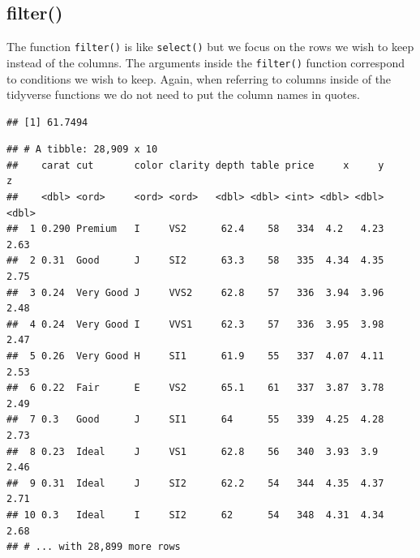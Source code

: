 \documentclass[
]{book}
\newenvironment{Shaded}{\begin{snugshade}}{\end{snugshade}}
\newcommand{\CommentTok}[1]{\textcolor[rgb]{0.56,0.35,0.01}{\textit{#1}}}
\newcommand{\KeywordTok}[1]{\textcolor[rgb]{0.13,0.29,0.53}{\textbf{#1}}}
\newcommand{\NormalTok}[1]{#1}
\newcommand{\OperatorTok}[1]{\textcolor[rgb]{0.81,0.36,0.00}{\textbf{#1}}}
\newcommand{\StringTok}[1]{\textcolor[rgb]{0.31,0.60,0.02}{#1}}
\begin{document}
\hypertarget{filter}{%
\subsection{filter()}\label{filter}}

The function \texttt{filter()} is like \texttt{select()} but we focus on the rows we wish to keep instead of the columns. The arguments inside the \texttt{filter()} function correspond to conditions we wish to keep. Again, when referring to columns inside of the tidyverse functions we do not need to put the column names in quotes.

\begin{Shaded}
\end{Shaded}

\begin{verbatim}
## [1] 61.7494
\end{verbatim}

\begin{Shaded}
\end{Shaded}

\begin{verbatim}
## # A tibble: 28,909 x 10
##    carat cut       color clarity depth table price     x     y     z
##    <dbl> <ord>     <ord> <ord>   <dbl> <dbl> <int> <dbl> <dbl> <dbl>
##  1 0.290 Premium   I     VS2      62.4    58   334  4.2   4.23  2.63
##  2 0.31  Good      J     SI2      63.3    58   335  4.34  4.35  2.75
##  3 0.24  Very Good J     VVS2     62.8    57   336  3.94  3.96  2.48
##  4 0.24  Very Good I     VVS1     62.3    57   336  3.95  3.98  2.47
##  5 0.26  Very Good H     SI1      61.9    55   337  4.07  4.11  2.53
##  6 0.22  Fair      E     VS2      65.1    61   337  3.87  3.78  2.49
##  7 0.3   Good      J     SI1      64      55   339  4.25  4.28  2.73
##  8 0.23  Ideal     J     VS1      62.8    56   340  3.93  3.9   2.46
##  9 0.31  Ideal     J     SI2      62.2    54   344  4.35  4.37  2.71
## 10 0.3   Ideal     I     SI2      62      54   348  4.31  4.34  2.68
## # ... with 28,899 more rows
\end{verbatim}
\end{document}
